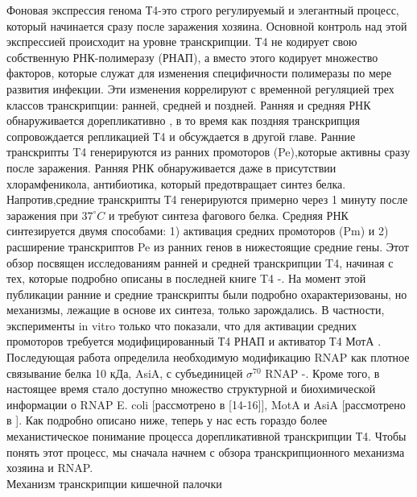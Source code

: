 \documentclass[a4paper,12pt]{article}
\begin{document}
        \par{
        Фоновая экспрессия генома Т4-это строго регулируемый и элегантный процесс, который начинается сразу после заражения
        хозяина. Основной контроль над этой экспрессией происходит на уровне транскрипции. Т4 не кодирует свою собственную
        РНК-полимеразу (РНАП), а вместо этого кодирует множество факторов, которые служат для изменения специфичности
        полимеразы по мере развития инфекции. Эти изменения коррелируют с временной регуляцией трех классов транскрипции:
        ранней, средней и поздней. Ранняя и средняя РНК обнаруживается дорепликативно
        \cite{hinton1,hinton2,hinton3,hinton4,hinton5,hinton6}, в то время как поздняя транскрипция сопровождается
        репликацией Т4 и обсуждается в другой главе. Ранние транскрипты T4 генерируются из ранних промоторов (Pe),которые
        активны сразу после заражения. Ранняя РНК обнаруживается даже в присутствии хлорамфеникола, антибиотика, который
        предотвращает синтез белка. Напротив,средние транскрипты Т4 генерируются примерно через 1 минуту после заражения при
        \(37^\circ C\)  и требуют синтеза фагового белка. Средняя РНК синтезируется двумя способами: 1) активация средних
        промоторов (Pm) и 2) расширение транскриптов Pe из ранних генов в нижестоящие средние гены. Этот обзор посвящен
        исследованиям ранней и средней транскрипции T4, начиная с тех, которые подробно описаны в последней книге T4
        \cite{hinton1}-\cite{hinton5}. На момент этой публикации ранние и средние транскрипты были подробно охарактеризованы,
        но механизмы, лежащие в основе их синтеза, только зарождались. В частности, эксперименты in vitro только что
        показали, что для активации средних промоторов требуется модифицированный Т4 РНАП и активатор Т4 МотА
        \cite{hinton7,hinton8}. Последующая работа определила необходимую модификацию RNAP как плотное связывание белка 10
        кДа, AsiA, с субъединицей \(\sigma^{70}\) RNAP \cite{hinton9}-\cite{hinton13}. Кроме того, в настоящее время стало
        доступно множество структурной и биохимической информации о RNAP E. coli [рассмотрено в [14-16]], MotA и AsiA
        [рассмотрено в \cite{hinton2}]. Как подробно описано ниже, теперь у нас есть гораздо более механистическое понимание
        процесса дорепликативной транскрипции Т4. Чтобы понять этот процесс, мы сначала начнем с обзора транскрипционного
        механизма хозяина и RNAP.} \\ 
    {\Large Механизм транскрипции кишечной палочки }
\end{document}
